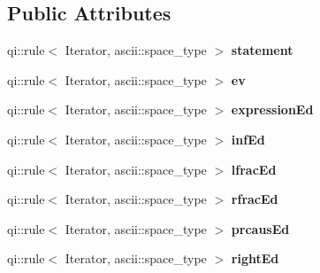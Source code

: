 \subsection*{Public Attributes}
\begin{DoxyCompactItemize}
\item 
\mbox{\label{structcalculator_etvo_1_1calculator_aeb809fd31fb429a4036d0246efa8c0a3}} 
qi\+::rule$<$ Iterator, ascii\+::space\+\_\+type $>$ {\bfseries statement}
\item 
\mbox{\label{structcalculator_etvo_1_1calculator_a2fa5017612913058b3b43f6fad3773c7}} 
qi\+::rule$<$ Iterator, ascii\+::space\+\_\+type $>$ {\bfseries ev}
\item 
\mbox{\label{structcalculator_etvo_1_1calculator_a0559f790e3950e00adf954df0f7af0e8}} 
qi\+::rule$<$ Iterator, ascii\+::space\+\_\+type $>$ {\bfseries expression\+Ed}
\item 
\mbox{\label{structcalculator_etvo_1_1calculator_a607636f6ca0dfa332eaff309ae31afe0}} 
qi\+::rule$<$ Iterator, ascii\+::space\+\_\+type $>$ {\bfseries inf\+Ed}
\item 
\mbox{\label{structcalculator_etvo_1_1calculator_a04e25cab20ace8c27a4829d8ce9e96e6}} 
qi\+::rule$<$ Iterator, ascii\+::space\+\_\+type $>$ {\bfseries lfrac\+Ed}
\item 
\mbox{\label{structcalculator_etvo_1_1calculator_a8617083ed1d40f323392e599ae72f38e}} 
qi\+::rule$<$ Iterator, ascii\+::space\+\_\+type $>$ {\bfseries rfrac\+Ed}
\item 
\mbox{\label{structcalculator_etvo_1_1calculator_a988bc851dee4ed6e874708f78bc12993}} 
qi\+::rule$<$ Iterator, ascii\+::space\+\_\+type $>$ {\bfseries prcaus\+Ed}
\item 
\mbox{\label{structcalculator_etvo_1_1calculator_a69fc90d00ea5f1ce889e36e05d7749dd}} 
qi\+::rule$<$ Iterator, ascii\+::space\+\_\+type $>$ {\bfseries right\+Ed}
\item 

\end{DoxyCompactItemize}
